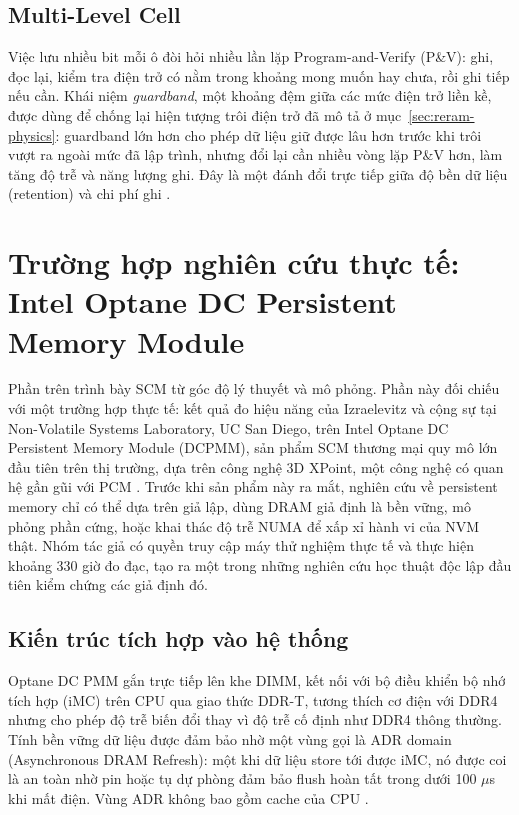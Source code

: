 \documentclass[12pt,a4paper]{article}
\begin{document}
\subsection{Multi-Level Cell}

Việc lưu nhiều bit mỗi ô đòi hỏi nhiều lần lặp Program-and-Verify (P\&V): ghi, đọc lại, kiểm tra điện trở có nằm trong khoảng mong muốn hay chưa, rồi ghi tiếp nếu cần. Khái niệm \textit{guardband}, một khoảng đệm giữa các mức điện trở liền kề, được dùng để chống lại hiện tượng trôi điện trở đã mô tả ở mục~\ref{sec:reram-physics}: guardband lớn hơn cho phép dữ liệu giữ được lâu hơn trước khi trôi vượt ra ngoài mức đã lập trình, nhưng đổi lại cần nhiều vòng lặp P\&V hơn, làm tăng độ trễ và năng lượng ghi. Đây là một đánh đổi trực tiếp giữa độ bền dữ liệu (retention) và chi phí ghi \cite{kamath2019}.

\section{Trường hợp nghiên cứu thực tế: Intel Optane DC Persistent Memory Module}
\label{sec:optane}

Phần trên trình bày SCM từ góc độ lý thuyết và mô phỏng. Phần này đối chiếu với một trường hợp thực tế: kết quả đo hiệu năng của Izraelevitz và cộng sự tại Non-Volatile Systems Laboratory, UC San Diego, trên Intel Optane DC Persistent Memory Module (DCPMM), sản phẩm SCM thương mại quy mô lớn đầu tiên trên thị trường, dựa trên công nghệ 3D XPoint, một công nghệ có quan hệ gần gũi với PCM \cite{izraelevitz2019}. Trước khi sản phẩm này ra mắt, nghiên cứu về persistent memory chỉ có thể dựa trên giả lập, dùng DRAM giả định là bền vững, mô phỏng phần cứng, hoặc khai thác độ trễ NUMA để xấp xỉ hành vi của NVM thật. Nhóm tác giả có quyền truy cập máy thử nghiệm thực tế và thực hiện khoảng 330 giờ đo đạc, tạo ra một trong những nghiên cứu học thuật độc lập đầu tiên kiểm chứng các giả định đó.

\subsection{Kiến trúc tích hợp vào hệ thống}

Optane DC PMM gắn trực tiếp lên khe DIMM, kết nối với bộ điều khiển bộ nhớ tích hợp (iMC) trên CPU qua giao thức DDR-T, tương thích cơ điện với DDR4 nhưng cho phép độ trễ biến đổi thay vì độ trễ cố định như DDR4 thông thường. Tính bền vững dữ liệu được đảm bảo nhờ một vùng gọi là ADR domain (Asynchronous DRAM Refresh): một khi dữ liệu store tới được iMC, nó được coi là an toàn nhờ pin hoặc tụ dự phòng đảm bảo flush hoàn tất trong dưới 100 $\mu$s khi mất điện. Vùng ADR không bao gồm cache của CPU \cite{izraelevitz2019}.
\end{document}
